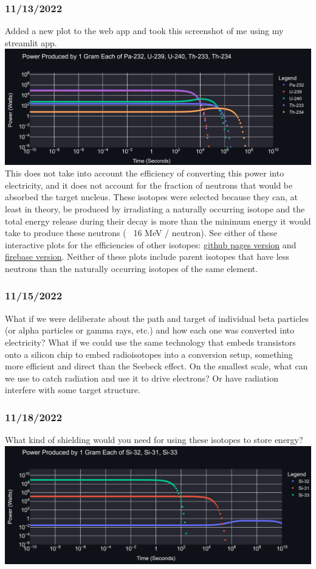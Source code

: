 \documentclass[12pt]{article}
\begin{document}
\subsubsection{11/13/2022}
Added a new plot to the web app and took this screenshot of me using my streamlit app. \\
\includegraphics[scale=.6]{Images/newplot(4).png}\\
This does not take into account the efficiency of converting this power into electricity, and it does not account for the fraction of neutrons that would be absorbed the target nucleus. These isotopes were selected because they can, at least in theory, be produced by irradiating a naturally occurring isotope and the total energy release during their decay is more than the minimum energy it would take to produce these neutrons (~ 16 MeV / neutron). See either of these interactive plots for the efficiencies of other isotopes: \href{https://marcosp7635.github.io/plots/keV_per_neutron.html}{github pages version} and \href{https://mp7635plots.web.app/keV_per_neutron.html}{firebase version}. Neither of these plots include parent isotopes that have less neutrons than the naturally occurring isotopes of the same element. 
\subsubsection{11/15/2022}
What if we were deliberate about the path and target of individual beta particles (or alpha particles or gamma rays, etc.) and how each one was converted into electricity? What if we could use the same technology that embeds transistors onto a silicon chip to embed radioisotopes into a conversion setup, something more efficient and direct than the Seebeck effect. On the smallest scale, what can we use to catch radiation and use it to drive electrons? Or have radiation interfere with some target structure. 
\subsubsection{11/18/2022}
What kind of shielding would you need for using these isotopes to store energy?\\
\includegraphics[scale=.65]{Images/silicon_plot.PNG}
\end{document}
